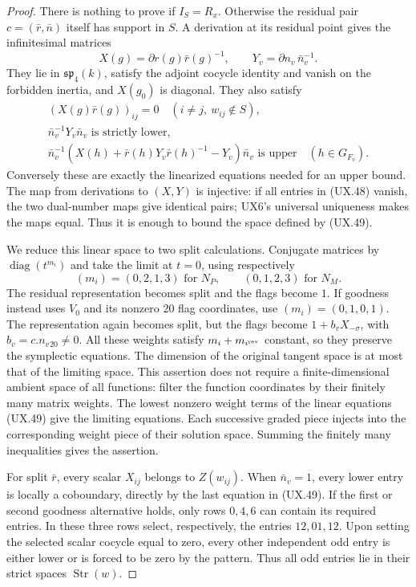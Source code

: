 \begin{proof}
There is nothing to prove if $I_S=R_x$.  Otherwise
the residual pair $c=(\bar r,\bar n)$ itself has
support in $S$.  A derivation at its residual
point gives the infinitesimal matrices
\[
 X(g)=\partial r(g)\bar r(g)^{-1},\qquad
 Y_v=\partial n_v\,\bar n_v^{-1}.
 \tag{UX.48}
\]
They lie in $\mathfrak{sp}_4(k)$, satisfy the
adjoint cocycle identity and vanish on the
forbidden inertia, and $X(g_0)$ is diagonal.
They also satisfy
\[
 \begin{gathered}
 (X(g)\bar r(g))_{ij}=0\quad
                       (i\ne j,\ w_{ij}\notin S),\\
 \bar n_v^{-1}Y_v\bar n_v\text{ is strictly lower},\\
 \bar n_v^{-1}\!
 \left(X(h)+\bar r(h)Y_v\bar r(h)^{-1}-Y_v\right)
 \bar n_v\text{ is upper}\quad(h\in G_{F_v}).
 \end{gathered}
 \tag{UX.49}
\]
Conversely these are exactly the linearized
equations needed for an upper bound.  The
map from derivations to $(X,Y)$ is injective:
if all entries in (UX.48) vanish, the two
dual-number maps give identical pairs;
UX6's universal uniqueness makes the maps
equal.  Thus it is enough to bound the
space defined by (UX.49).

We reduce this linear space to two split
calculations.  Conjugate matrices by
$\operatorname{diag}(t^{m_i})$ and take
the limit at $t=0$, using respectively
\[
 (m_i)=(0,2,1,3)\text{ for }N_P,\qquad
 (0,1,2,3)\text{ for }N_M.
 \tag{UX.50}
\]
The residual representation becomes split
and the flags become $1$.  If goodness
instead uses $V_0$ and its nonzero $20$
flag coordinates, use $(m_i)=(0,1,0,1)$.
The representation again becomes split,
but the flags become
$1+b_vX_{-\sigma}$, with $b_v=c.n_v{}_{20}\ne0$.
All these weights satisfy
$m_i+m_{i^{\rm rev}}$ constant, so they
preserve the symplectic equations.
The dimension of the original tangent
space is at most that of the limiting
space.  This assertion does not require
a finite-dimensional ambient space of
all functions: filter the function
coordinates by their finitely many
matrix weights.  The lowest nonzero
weight terms of the linear equations
(UX.49) give the limiting equations.
Each successive graded piece injects
into the corresponding weight piece
of their solution space.  Summing the
finitely many inequalities gives the
assertion.

For split $\bar r$, every scalar
$X_{ij}$ belongs to $Z(w_{ij})$.
When $\bar n_v=1$, every lower entry
is locally a coboundary, directly by
the last equation in (UX.49).
If the first or second goodness
alternative holds, only rows $0,4,6$
can contain its required entries.
In these three rows select, respectively,
the entries $12,01,12$.  Upon setting
the selected scalar cocycle equal to
zero, every other independent odd
entry is either lower or is forced
to be zero by the pattern.  Thus all
odd entries lie in their strict
spaces $\operatorname{Str}(w)$.


\end{proof}
